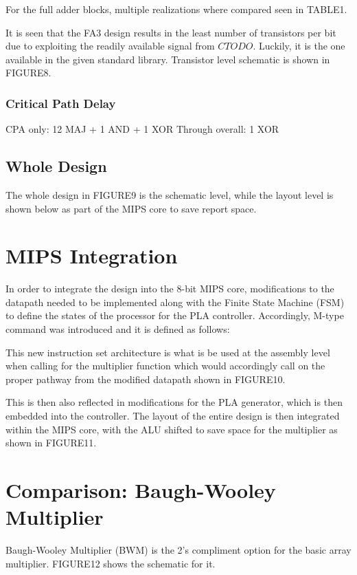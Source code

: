 \documentclass[conference]{IEEEtran}
\begin{document}
For the full adder blocks, multiple realizations where compared seen in TABLE1.


It is seen that the FA3 design results in the least number of transistors per bit due to exploiting the readily available signal from $CTODO$. Luckily, it is the one available in the given standard library. Transistor level schematic is shown in FIGURE8.

\subsubsection{Critical Path Delay}

CPA only: 12 MAJ + 1 AND + 1 XOR
Through overall: 1 XOR


\subsection{Whole Design}

The whole design in FIGURE9 is the schematic level, while the layout level is shown below as part of the MIPS core to save report space.


\section{MIPS Integration}

In order to integrate the design into the 8-bit MIPS core, modifications to the datapath needed to be implemented along with the Finite State Machine (FSM) to define the states of the processor for the PLA controller. Accordingly, M-type command was introduced and it is defined as follows:

This new instruction set architecture is what is be used at the assembly level when calling for the multiplier function which would accordingly call on the proper pathway from the modified datapath shown in FIGURE10.

This is then also reflected in modifications for the PLA generator, which is then embedded into the controller. The layout of the entire design is then integrated within the MIPS core, with the ALU shifted to save space for the multiplier as shown in FIGURE11.

\section{Comparison: Baugh-Wooley Multiplier}

Baugh-Wooley Multiplier (BWM) is the 2’s compliment option for the basic array multiplier. FIGURE12 shows the schematic for it.
\end{document}
